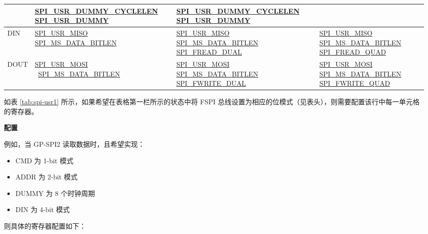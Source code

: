 \documentclass[main\_\_CN.tex]{subfiles}
\begin{document}
\begin{longtable}[c]{ |L{1.3cm}|L{4.8cm}|L{4.8cm}|L{4.8cm}| }
     &\hyperref[fielddesc:SPIUSRDUMMYCYCLELEN]{SPI\_USR\_DUMMY\_CYCLELEN}    \hyperref[fielddesc:SPIUSRDUMMY]{SPI\_USR\_DUMMY} & 
    \hyperref[fielddesc:SPIUSRDUMMYCYCLELEN]{SPI\_USR\_DUMMY\_CYCLELEN}    \hyperref[fielddesc:SPIUSRDUMMY]{SPI\_USR\_DUMMY}\\
     \hline
DIN  &\hyperref[fielddesc:SPIUSRMISO]{SPI\_USR\_MISO}   
      \hyperref[fielddesc:SPIMSDATABITLEN]{SPI\_MS\_DATA\_BITLEN} 
     &\hyperref[fielddesc:SPIUSRMISO]{SPI\_USR\_MISO}  
     \hyperref[fielddesc:SPIMSDATABITLEN]{SPI\_MS\_DATA\_BITLEN}  
    \hyperref[fielddesc:SPIFREADDUAL]{SPI\_FREAD\_DUAL} 
     &\hyperref[fielddesc:SPIUSRMISO]{SPI\_USR\_MISO}  
     \hyperref[fielddesc:SPIMSDATABITLEN]{SPI\_MS\_DATA\_BITLEN}  
    \hyperref[fielddesc:SPIFREADQUAD]{SPI\_FREAD\_QUAD}\\
     \hline
DOUT &\hyperref[fielddesc:SPIUSRMOSI]{SPI\_USR\_MOSI}       \
      \hyperref[fielddesc:SPIMSDATABITLEN]{SPI\_MS\_DATA\_BITLEN} 
     &\hyperref[fielddesc:SPIUSRMOSI]{SPI\_USR\_MOSI}       
     \hyperref[fielddesc:SPIMSDATABITLEN]{SPI\_MS\_DATA\_BITLEN}      \hyperref[fielddesc:SPIFWRITEDUAL]{SPI\_FWRITE\_DUAL} & 
    \hyperref[fielddesc:SPIUSRMOSI]{SPI\_USR\_MOSI}       
     \hyperref[fielddesc:SPIMSDATABITLEN]{SPI\_MS\_DATA\_BITLEN}      \hyperref[fielddesc:SPIFWRITEQUAD]{SPI\_FWRITE\_QUAD} \\
     \hline
\end{longtable}

如表 \ref{tab:spi-usr1} 所示，如果希望在表格第一栏所示的状态中将 FSPI 总线设置为相应的位模式（见表头），则需要配置该行中每一单元格的寄存器。 

\textbf{配置}

例如，当 GP-SPI2 读取数据时，且希望实现： 
\begin{itemize}
    \item CMD 为 1-bit 模式
    \item ADDR 为 2-bit 模式
    \item DUMMY 为 8 个时钟周期
    \item DIN 为 4-bit 模式
\end{itemize}
则具体的寄存器配置如下：
\end{document}
